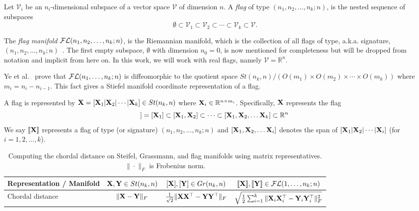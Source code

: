\begin{dfn}[Flag]
    Let $\mathcal{V}_i$ be an $n_i$-dimensional subspace of a vector space $\mathcal{V}$ of dimension $n$. A \emph{flag} of type $(n_1,n_2,\dots, n_k;n)$, is the nested sequence of subspaces
    \begin{equation}
        \emptyset \subset \mathcal{V}_1 \subset \mathcal{V}_2 \subset \cdots \subset \mathcal{V}_k \subset \mathcal{V}.
    \end{equation}
\end{dfn}
The \emph{flag manifold} $\mathcal{FL}(n_1,n_2,\dots, n_k;n)$, is the Riemannian manifold, which is the collection of all flags of type, a.k.a. signature, $(n_1,n_2,\dots, n_k;n)$~\cite{szwagier2023rethinking,ye2022optimization}. The first empty subspace, $\emptyset$ with dimension $n_0 = 0$, is now mentioned for completeness but will be dropped from notation and implicit from here on. In this work, we will work with real flags, namely $\mathcal{V} = \mathbb{R}^n$. 




\begin{remark}
Ye et al.~\cite[Proposition 4.10]{ye2022optimization} prove that $\mathcal{FL}(n_1,\dots,n_k;n)$ is diffeomorphic to the quotient space $St(n_k,n)/(O(m_1) \times O(m_2) \times \cdots \times O(m_{k}))$ where $m_i = n_i - n_{i-1}$. This fact gives a Stiefel manifold coordinate representation of a flag.
\end{remark}

\begin{dfn}
A flag is represented by $\mathbf{X}  = [ \mathbf{X}_1 | \mathbf{X}_2 | \cdots | \mathbf{X}_k ] \in St(n_k,n)$ where $\mathbf{X}_i \in \mathbb{R}^{n \times m_i}$. Specifically, $\mathbf{X}$ represents the flag 
\begin{equation}
    [\![ \X ]\!] = [\X_1] \subset [\X_1, \X_2] \subset \cdots \subset [\X_1, \X_2,\dots \X_k] \subset \R^n
\end{equation}
We say $[\![ \mathbf{X} ]\!]$ represents a flag of type (or signature) $(n_1,n_2,\dots, n_k;n)$ and $[\mathbf{X}_1, \mathbf{X}_2,\dots \mathbf{X}_i]$ denotes the span of $[\mathbf{X}_1| \mathbf{X}_2 |\cdots |\mathbf{X}_i]$ (for $i=1,2,\dots,k$).
\end{dfn}


\begin{table*}[t]
    \centering
    \caption{Computing the chordal distance on Steifel, Grassmann, and flag manifolds using matrix representatives. $\|\cdot\|_F$ is Frobenius norm.}
    \setlength{\tabcolsep}{4mm} 
    {%
    \begin{tabular}{l| c | c |c}
        Representation / Manifold & $\mathbf{X},\mathbf{Y} \in St(n_k,n)$ & $[\mathbf{X}],[\mathbf{Y}] \in Gr(n_k,n)$  &  $[\![\mathbf{X}]\!],[\![\mathbf{Y}]\!] \in \mathcal{FL}(1,\dots,n_k;n)$\\
        \midrule
        Chordal distance & $\|\mathbf{X} - \mathbf{Y}\|_F$ &  $\frac{1}{\sqrt{2}}\|\mathbf{X}\mathbf{X}^\top - \mathbf{Y}\mathbf{Y}^\top\|_F$ & $\sqrt{\frac{1}{2}\sum_{i=1}^k\|\mathbf{X}_i\mathbf{X}_i^\top - \mathbf{Y}_i\mathbf{Y}_i^\top\|_F^2}$
    \end{tabular}
    }
    \label{tab:chordaldist}
\end{table*}



